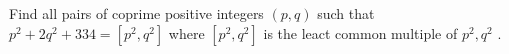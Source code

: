 Find all pairs of coprime positive integers $(p,q)$ such that  $p^2+2q^2+334=[p^2,q^2]$ where $[p^2,q^2]$ is the leact common multiple of $p^2,q^2$ .